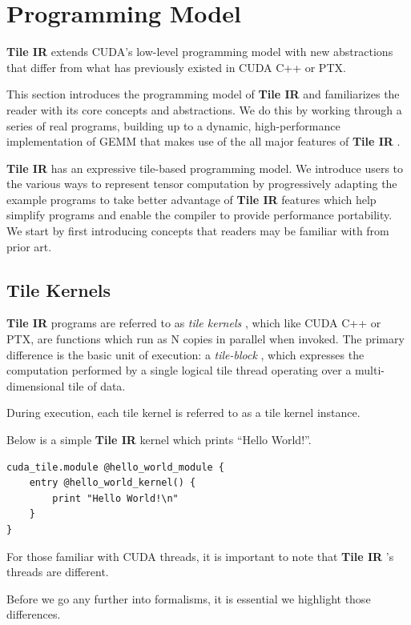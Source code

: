 \documentclass{article}
\begin{document}
\newpage
\section{Programming Model}

\textbf{Tile IR} extends CUDA's low-level programming model with new abstractions that differ from what has previously existed in CUDA C++ or PTX.


This section introduces the programming model of \textbf{Tile IR} and familiarizes the reader with its core concepts and abstractions. We do this by working through a series of real programs, building up to a dynamic, high-performance implementation of GEMM that makes use of the all major features of \textbf{Tile IR} .


\textbf{Tile IR} has an expressive tile-based programming model. We introduce users to the various ways to represent tensor computation by progressively adapting the example programs to take better advantage of \textbf{Tile IR} features which help simplify programs and enable the compiler to provide performance portability. We start by first introducing concepts that readers may be familiar with from prior art.


\subsection{Tile Kernels}

\textbf{Tile IR} programs are referred to as \textit{tile kernels} , which like CUDA C++ or PTX, are functions which run as N copies in parallel when invoked. The primary difference is the basic unit of execution: a \textit{tile-block} , which expresses the computation performed by a single logical tile thread operating over a multi-dimensional tile of data.


During execution, each tile kernel is referred to as a tile kernel instance.


Below is a simple \textbf{Tile IR} kernel which prints ``Hello World!''.


\begin{lstlisting}
cuda_tile.module @hello_world_module {
    entry @hello_world_kernel() {
        print "Hello World!\n"
    }
}
\end{lstlisting}

For those familiar with CUDA threads, it is important to note that \textbf{Tile IR} 's threads are different.

Before we go any further into formalisms, it is essential we highlight those differences.
\end{document}
